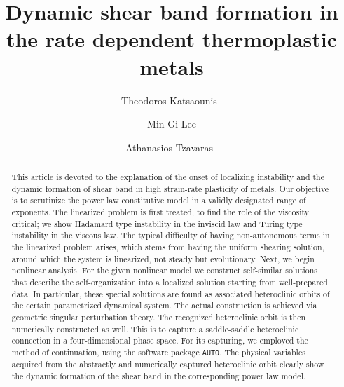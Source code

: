 \documentclass[a4paper,11pt]{article}
\theoremstyle{remark}
\begin{document}
\title{Dynamic shear band formation in the rate dependent thermoplastic metals}
\author{Theodoros Katsaounis\footnotemark[1]\ \footnotemark[2]
\and Min-Gi Lee\footnotemark[1]
\and Athanasios Tzavaras\footnotemark[1]\  \footnotemark[2]  \footnotemark[3]}
\date{}

\maketitle
\renewcommand{\thefootnote}{\fnsymbol{footnote}}
\renewcommand{\thefootnote}{\arabic{footnote}}
\begin{abstract}


This article is devoted to the explanation of the onset of localizing instability and the dynamic formation of shear band in high strain-rate plasticity of metals. Our objective is to scrutinize the power law constitutive model in a validly designated range of exponents. The linearized problem is first treated, to find the role of the viscosity critical; we show Hadamard type instability in the inviscid law and Turing type instability in the viscous law. The typical difficulty of having non-autonomous terms in the linearized problem arises, which stems from having the uniform shearing solution, around which the system is linearized, not steady but evolutionary. Next, we begin nonlinear analysis. For the given nonlinear model we construct self-similar solutions that describe
the self-organization into a localized solution starting from well-prepared data. In particular, these special solutions are found as associated heteroclinic orbits of the certain parametrized dynamical system. The actual construction is achieved via geometric singular perturbation theory. The recognized heteroclinic orbit is then numerically constructed as well. This is to capture a saddle-saddle heteroclinic connection in a four-dimensional phase space. For its capturing, we employed the method of continuation, using the software package \texttt{AUTO}. The physical variables acquired from the abstractly and numerically captured heteroclinic orbit clearly show the dynamic formation of the shear band in the corresponding power law model.
\end{abstract}
\end{document}
